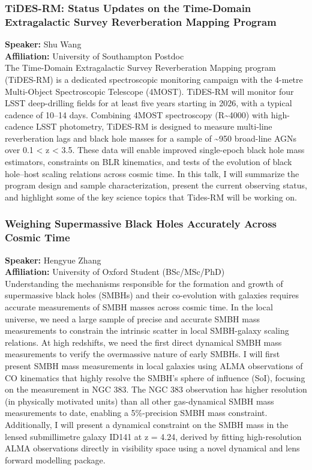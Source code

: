\subsubsection*{TiDES-RM: Status Updates on the Time-Domain Extragalactic Survey Reverberation Mapping Program}
\textbf{Speaker:} Shu Wang \\
\textbf{Affiliation:} University of Southampton \textperiodcentered{} Postdoc\\
The Time-Domain Extragalactic Survey Reverberation Mapping program (TiDES-RM) is a dedicated spectroscopic monitoring campaign with the 4-metre Multi-Object Spectroscopic Telescope (4MOST). TiDES-RM will monitor four LSST deep-drilling fields for at least five years starting in 2026, with a typical cadence of 10–14 days. Combining 4MOST spectroscopy (R\textasciitilde{}4000) with high-cadence LSST photometry, TiDES-RM is designed to measure multi-line reverberation lags and black hole masses for a sample of \textasciitilde{}950 broad-line AGNs over 0.1 < z < 3.5. These data will enable improved single-epoch black hole mass estimators, constraints on BLR kinematics, and tests of the evolution of black hole–host scaling relations across cosmic time. In this talk, I will summarize the program design and sample characterization, present the current observing status, and highlight some of the key science topics that Tides-RM will be working on.

\hypertarget{abs-22}{}
\subsubsection*{Weighing Supermassive Black Holes Accurately Across Cosmic Time}
\textbf{Speaker:} Hengyue Zhang \\
\textbf{Affiliation:} University of Oxford \textperiodcentered{} Student (BSc/MSc/PhD)\\
Understanding the mechanisms responsible for the formation and growth of supermassive black holes (SMBHs) and their co-evolution with galaxies requires accurate measurements of SMBH masses across cosmic time. In the local universe, we need a large sample of precise and accurate SMBH mass measurements to constrain the intrinsic scatter in local SMBH-galaxy scaling relations. At high redshifts, we need the first direct dynamical SMBH mass measurements to verify the overmassive nature of early SMBHs. I will first present SMBH mass measurements in local galaxies using ALMA observations of CO kinematics that highly resolve the SMBH’s sphere of influence (SoI), focusing on the measurement in NGC 383. The NGC 383 observation has higher resolution (in physically motivated units) than all other gas-dynamical SMBH mass measurements to date, enabling a 5\%-precision SMBH mass constraint. Additionally, I will present a dynamical constraint on the SMBH mass in the lensed submillimetre galaxy ID141 at z = 4.24, derived by fitting high-resolution ALMA observations directly in visibility space using a novel dynamical and lens forward modelling package.

